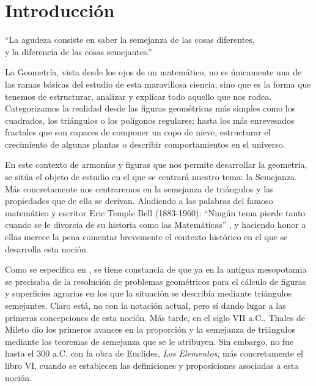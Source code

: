 \chapter*{Introducción}
\setcounter{page}{1}
\begin{dedication} 
\large ``La agudeza consiste en saber la semejanza de las cosas diferentes,\\ y la diferencia de las cosas semejantes.''
\end{dedication}
\pagestyle{fancy}

	La Geometría, vista desde los ojos de un matemático, no es únicamente una de las ramas básicas del estudio de esta maravillosa ciencia, sino que es la forma que tenemos de estructurar, analizar y explicar todo aquello que nos rodea. Categorizamos la realidad desde las figuras geométricas más simples como los cuadrados, los triángulos o los polígonos regulares; hasta los más enrevesados fractales que son capaces de componer un copo de nieve, estructurar el crecimiento de algunas plantas o describir comportamientos en el universo.
	
	En este contexto de armonías y figuras que nos permite desarrollar la geometría, se sitúa el objeto de estudio en el que se centrará nuestro tema: la Semejanza. Más concretamente nos centraremos en la semejanza de triángulos y las propiedades que de ella se derivan. Aludiendo a las palabras del famoso matemático y escritor Eric Temple Bell (1883-1960): ``Ningún tema pierde tanto cuando se le divorcia de su historia como las Matemáticas'' \cite[p. 17]{Suma45}, y haciendo honor a ellas merece la pena comentar brevemente el contexto histórico en el que se desarrolla esta noción.
	
	Como se especifica en \citet{Suma58}, se tiene constancia de que ya en la antigua mesopotamia se precisaba de la resolución de problemas geométricos para el cálculo de figuras y superficies agrarias en los que la situación se describía mediante triángulos semejantes. Claro está, no con la notación actual, pero sí dando lugar a las primeras concepciones de esta noción. Más tarde, en el siglo VII a.C., Thales de Mileto dio los primeros avances en la proporción y la semejanza de triángulos mediante los teoremas de semejanza que se le atribuyen. Sin embargo, no fue hasta el 300 a.C. con la obra de Euclides, \textit{Los Elementos}, más concretamente el libro VI, cuando se establecen las definiciones y proposiciones asociadas a esta noción.
	
